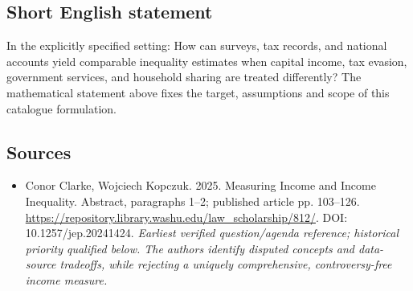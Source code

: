 \documentclass[11pt]{article}
\begin{document}
\subsection{Short English statement}
In the explicitly specified setting: How can surveys, tax records, and national accounts yield comparable inequality estimates when capital income, tax evasion, government services, and household sharing are treated differently? The mathematical statement above fixes the target, assumptions and scope of this catalogue formulation.

\subsection{Sources}
\begin{itemize}\raggedright
\item[\textnormal{[S1]}]\hypertarget{source:30007642:1}{} Conor Clarke, Wojciech Kopczuk. 2025. Measuring Income and Income Inequality. Abstract, paragraphs 1–2; published article pp. 103–126.
\url{https://repository.library.washu.edu/law_scholarship/812/}.
DOI: 10.1257/jep.20241424.
{\small\textit{Earliest verified question/agenda reference; historical priority qualified below. The authors identify disputed concepts and data-source tradeoffs, while rejecting a uniquely comprehensive, controversy-free income measure.}}
\end{itemize}
\end{document}
